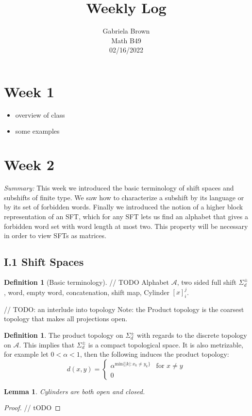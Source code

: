 \documentclass[11pt, reqno]{amsart}
\title{Weekly Log}
\author{Gabriela Brown\\ Math B49 \\ 02/16/2022}
\theoremstyle{plain}
\numberwithin{thm}{subsection}
\newtheorem{lemma}[thm]{Lemma}
\theoremstyle{definition}
\newtheorem{defn}[thm]{Definition}
\def\cA{\mathcal{A}}\def\cB{\mathcal{B}}\def\cC{\mathcal{C}}\def\cD{\mathcal{D}}\def\cE{\mathcal{E}}\def\cF{\mathcal{F}}\def\cG{\mathcal{G}}\def\cH{\mathcal{H}}\def\cI{\mathcal{I}}\def\cJ{\mathcal{J}}\def\cK{\mathcal{K}}\def\cL{\mathcal{L}}\def\cM{\mathcal{M}}\def\cN{\mathcal{N}}\def\cO{\mathcal{O}}\def\cP{\mathcal{P}}\def\cQ{\mathcal{Q}}\def\cR{\mathcal{R}}\def\cS{\mathcal{S}}\def\cT{\mathcal{T}}\def\cU{\mathcal{U}}\def\cV{\mathcal{V}}\def\cW{\mathcal{W}}\def\cX{\mathcal{X}}\def\cY{\mathcal{Y}}\def\cZ{\mathcal{Z}}
\def\tsfs{\Sigma^{\pm}_d}
\begin{document}
\maketitle

\section{Week 1}
\begin{itemize}
    \item overview of class
    \item some examples
\end{itemize}

\section*{Week 2}
\textit{Summary:} This week we introduced the basic terminology of shift spaces and subshifts of finite type. We saw how to characterize a subshift by its language or by its set of forbidden words. Finally we introduced the notion of a higher block representation of an SFT, which for any SFT lets us find an alphabet that gives a forbidden word set with word length at most two. This property will be necessary in order to view SFTs as matrices.

\subsection*{I.1 Shift Spaces}
\begin{defn}[Basic terminology]
    // TODO
    Alphabet $\cA$, two sided full shift $\Sigma^{\pm}_d$, word, empty word, concatenation, shift map, Cylinder $[x]_i^j$.
\end{defn}

// TODO: an interlude into topology
Note: the Product topology is the coarsest topology that makes all projections open.
\begin{defn}
    The product topology on $\tsfs$ with regards to the discrete topology on $\cA$. This implies that $\tsfs$ is a compact topological space. It is also metrizable, for example let $0 < \alpha < 1$, then the following induces the product topology:
    $$d(x,y) = \begin{cases}
        \alpha^{\text{min}\{|k|:x_k \neq y_k\}} & \text{for $x \neq y$} \\ 
        0
    \end{cases}$$
\end{defn}

\begin{lemma}
    Cylinders are both open and closed. 
\end{lemma}
\begin{proof}
    // tODO
\end{proof}
\end{document}
